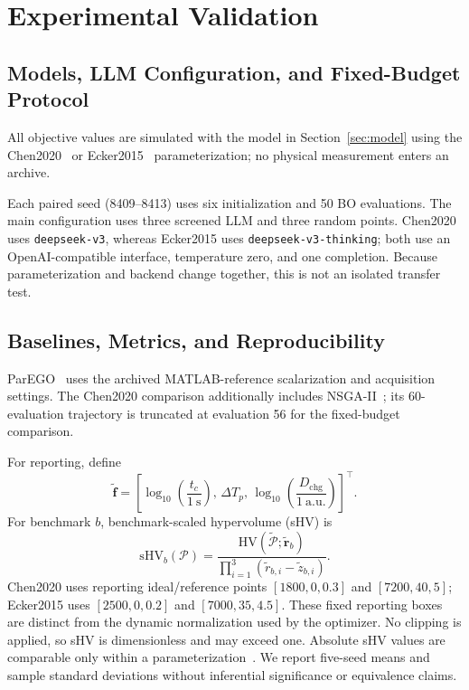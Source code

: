 

\section{Experimental Validation}
\label{sec:experiments}

\subsection{Models, LLM Configuration, and Fixed-Budget Protocol}

All objective values are simulated with the model in Section~\ref{sec:model}
using the Chen2020~\cite{ref12,ref13} or Ecker2015~\cite{ref12,ref14}
parameterization; no physical measurement enters an archive.

Each paired seed (8409--8413) uses six initialization and 50 BO evaluations.
The main configuration uses three screened LLM and three random points.
Chen2020 uses
\texttt{deepseek-v3}, whereas Ecker2015 uses
\texttt{deepseek-v3-thinking}; both use an OpenAI-compatible interface,
temperature zero, and one completion. Because parameterization and backend
change together, this is not an isolated transfer test.

\subsection{Baselines, Metrics, and Reproducibility}

ParEGO~\cite{ref5} uses the archived MATLAB-reference scalarization and
acquisition settings. The Chen2020 comparison additionally includes
NSGA-II~\cite{ref6}; its 60-evaluation trajectory is truncated at evaluation
56 for the fixed-budget comparison.

For reporting, define
\begin{equation*}
\widetilde{\mathbf f}=
\left[
\log_{10}\!\left(\frac{t_c}{1~\mathrm{s}}\right),\,
\Delta T_p,\,
\log_{10}\!\left(\frac{D_{\mathrm{chg}}}{1~\mathrm{a.u.}}\right)
\right]^\top .
\end{equation*}
For benchmark $b$, benchmark-scaled hypervolume (sHV) is
\begin{equation}
\mathrm{sHV}_b(\mathcal P)=
\frac{\mathrm{HV}(\widetilde{\mathcal P};\widetilde{\mathbf r}_b)}
{\prod_{i=1}^{3}(\widetilde r_{b,i}-\widetilde z_{b,i})}.
\label{eq:scaled_hv}
\end{equation}
Chen2020 uses reporting ideal/reference points
$[1800,0,0.3]$ and $[7200,40,5]$; Ecker2015 uses
$[2500,0,0.2]$ and $[7000,35,4.5]$. These fixed reporting boxes are distinct
from the dynamic normalization used by the optimizer. No clipping is applied,
so sHV is dimensionless and may exceed one. Absolute sHV values are comparable
only within a parameterization~\cite{ref25}. We report five-seed means and sample standard
deviations without inferential significance or equivalence claims.

